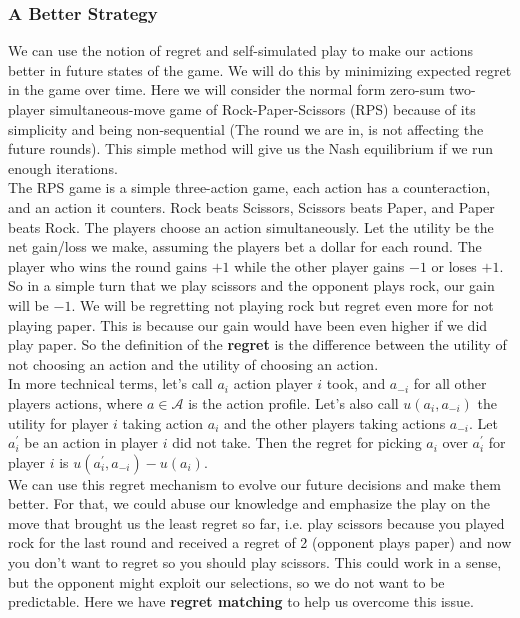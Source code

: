 \subsubsection{A Better Strategy} %
\label{ssub:betterStrategy}
We can use the notion of regret and self-simulated play to make our actions better 
in future states of the game. We will do this by minimizing expected regret in the 
game over time. Here we will consider the normal form zero-sum two-player simultaneous-move 
game of Rock-Paper-Scissors (RPS) because of its simplicity and being non-sequential 
(The round we are in, is not affecting the future rounds). This simple method will give us 
the Nash equilibrium if we run enough iterations.\\

The RPS game is a simple three-action game, each action has a counteraction, and an action it counters.
Rock beats Scissors, Scissors beats Paper, and Paper beats Rock. The players choose an action
simultaneously. Let the utility be the net gain/loss we make, assuming the players bet a dollar for
each round. The player who wins the round gains $+1$ while the other player gains $-1$ or loses $+1$.\\  

So in a simple turn that we play scissors and the opponent plays rock, our gain will be $-1$. We will be 
regretting not playing rock but regret even more for not playing paper. This is because our gain would
have been even higher if we did play paper. So the definition of the \textbf{regret} is the difference
between the utility of not choosing an action and the utility of choosing an action.\\

In more technical terms, let's call $a_i$ action player $i$ took, and $a_{-i}$ for all other players
actions, where $a \in \mathcal{A}$ is the action profile. Let's also call $u(a_i, a_{-i})$ the utility 
for player $i$ taking action $a_i$ and the other players taking actions $a_{-i}$. Let $a^{'}_i$ be an 
action in  player $i$ did not take. Then the regret for picking $a_i$ over $a^{'}_i$ for player
$i$ is $u(a^{'}_i, a_{-i}) - u(a_i)$.\\

We can use this regret mechanism to evolve our future decisions and make them better. For that, we could
abuse our knowledge and emphasize the play on the move that brought us the least regret so far, i.e.
play scissors because you played rock for the last round and received a regret of 2 (opponent plays paper)
and now you don't want to regret so you should play scissors. This could work in a sense, but the opponent
might exploit our selections, so we do not want to be predictable. Here we have \textbf{regret matching}
to help us overcome this issue.\\

